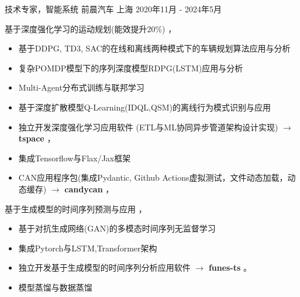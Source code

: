 \documentclass[../cv_cn.tex]{subfiles}
\begin{document}


\begin{cventries}

	\cventry
	{技术专家，智能系统} %
	{前晨汽车} %
	{上海} %
	{2020年11月 - 2024年5月} %
	{
		\begin{cvitems} %
			\item 基于深度强化学习的运动规划(能效提升20\%) \supercite{Xin_VEOS_22} \supercite{Xin_Fu_Pan_Simulation_Test_RL_22} \supercite{Pan_Xin_DrvStyle_23}，
			\begin{itemize}
				\item 基于DDPG, TD3, SAC的在线和离线两种模式下的车辆规划算法应用与分析
				\item 复杂POMDP模型下的序列深度模型RDPG(LSTM)应用与分析
				\item Multi-Agent分布式训练与联邦学习
				\item 基于深度扩散模型Q-Learning(IDQL,QSM)的离线行为模式识别与应用
				\item 独立开发深度强化学习应用软件 (ETL与ML协同异步管道架构设计实现) $\rightarrow$ \textbf{tspace} \href{https://binjian.github.io/tspace/}{\faGithub}，
				\item 集成Tensorflow与Flax/Jax框架
				\item CAN应用程序包(集成Pydantic, Github Actions虚拟测试，文件动态加载，动态缓存) $\rightarrow$ \textbf{candycan} \href{https://binjian.github.io/candycan/}{\faGithub}，
			\end{itemize}
			\item 基于生成模型的时间序列预测与应用 \supercite{Xin_GenAI_23} \supercite{Xin_Chen_NN_TSFeatures_23}，
			\begin{itemize}
				\item 基于对抗生成网络(GAN)的多模态时间序列无监督学习
				\item 集成Pytorch与LSTM,Transformer架构
				\item 独立开发基于生成模型的时间序列分析应用软件 $\rightarrow$ \textbf{funes-ts} \href{https://github.com/binjian/funes-ts/}{\faGithub}。
				\item 模型蒸馏与数据蒸馏

\end{itemize}
\end{cvitems}}
\end{cventries}
\end{document}
